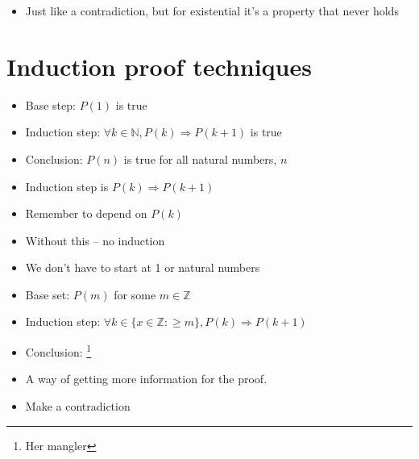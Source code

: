 \documentclass[english,10pt,a4paper]{article}
\begin{document}
\begin{theo} 
\begin{itemize}
\item Just like a contradiction, but for existential it's a property that never holds
\end{itemize}
\end{theo}



\newpage
\section{Induction proof techniques}

\begin{theo}[Basic] 
\begin{itemize}
\item Base step: $P(1)$ is true
\item Induction step: $\forall k \in \mathbb{N}, P(k) \Rightarrow P(k+1)$ is true
\item Conclusion: $P(n)$ is true for all natural numbers, $n$
\end{itemize}
\end{theo}


\begin{theo} 
\begin{itemize}
\item Induction step is $P(k) \Rightarrow P(k+1)$
\item Remember to depend on $P(k)$
\item Without this -- no induction
\end{itemize}
\end{theo}



\begin{theo} 
\begin{itemize}
\item We don't have to start at 1 or natural numbers
\item Base set: $P(m)$ for some $m\in \mathbb{Z}$
\item Induction step: $\forall k\in \{x \in \mathbb{Z}: \geq m \}, P(k) \Rightarrow P(k+1)$
\item Conclusion: \footnote{Her mangler}
\end{itemize}
\end{theo}


\begin{theo} 
\begin{itemize}
\item A way of getting more information for the proof.
\item Make a contradiction
\end{itemize}
\end{theo}
\end{document}

